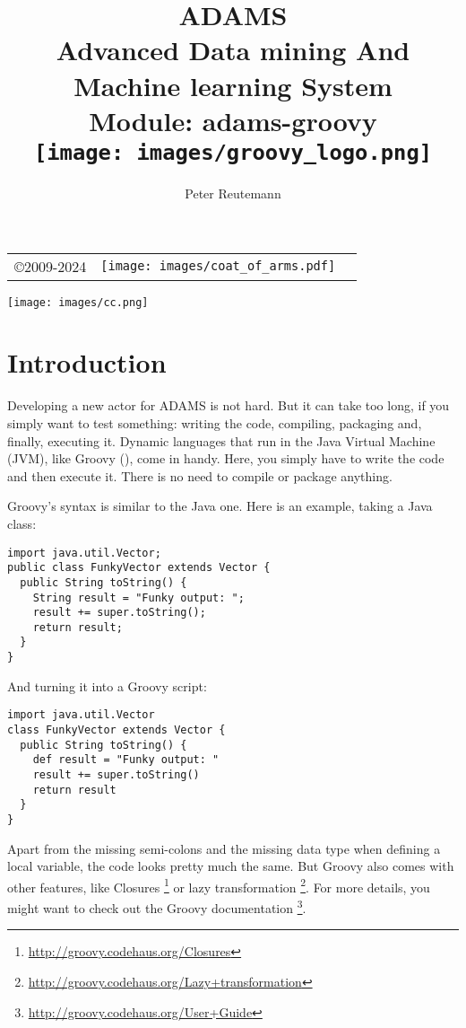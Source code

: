 \documentclass[a4paper]{book}
\title{
  \textbf{ADAMS} \\
  {\Large \textbf{A}dvanced \textbf{D}ata mining \textbf{A}nd \textbf{M}achine
  learning \textbf{S}ystem} \\
  {\Large Module: adams-groovy} \\
  \vspace{1cm}
  \texttt{[image: images/groovy\_logo.png]} \\
}
\author{
  Peter Reutemann
}
\begin{document}
\begin{titlepage}
\maketitle

\thispagestyle{empty}
\center
\begin{table}[b]
	\begin{tabular}{c l l}
		\parbox[c][2cm]{2cm}{\copyright 2009-2024} &
		\parbox[c][2cm]{5cm}{\texttt{[image: images/coat\_of\_arms.pdf]}} \\
	\end{tabular}
	\texttt{[image: images/cc.png]} \\
\end{table}

\end{titlepage}

\tableofcontents

\chapter{Introduction}
Developing a new actor for ADAMS is not hard. But it can take too long, if you
simply want to test something: writing the code, compiling, packaging and,
finally, executing it. Dynamic languages that run in the Java Virtual Machine
(JVM), like Groovy (\cite{groovy}), come in handy. Here, you simply have to
write the code and then execute it. There is no need to compile or package anything.

Groovy's syntax is similar to the Java one. Here is an example, taking a Java
class:
\begin{verbatim}
import java.util.Vector;
public class FunkyVector extends Vector {
  public String toString() {
    String result = "Funky output: ";
    result += super.toString();
    return result;
  }
}
\end{verbatim}
And turning it into a Groovy script:
\begin{verbatim}
import java.util.Vector
class FunkyVector extends Vector {
  public String toString() {
    def result = "Funky output: "
    result += super.toString()
    return result
  }
}
\end{verbatim}
Apart from the missing semi-colons and the missing data type when defining a
local variable, the code looks pretty much the same. But Groovy also comes
with other features, like Closures
\footnote{\url{http://groovy.codehaus.org/Closures}{}}
or lazy transformation
\footnote{\url{http://groovy.codehaus.org/Lazy+transformation}{}}.
For more details, you might want to check out the Groovy documentation
\footnote{\url{http://groovy.codehaus.org/User+Guide}{}}.
\end{document}
